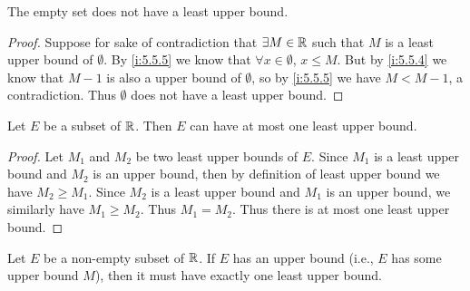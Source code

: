 \setcounter{thm}{6}
\begin{eg}\label{i:5.5.7}
  The empty set does not have a least upper bound.
\end{eg}

\begin{proof}
  Suppose for sake of contradiction that \(\exists M \in \mathbb{R}\) such that \(M\) is a least upper bound of \(\emptyset\).
  By \cref{i:5.5.5} we know that \(\forall x \in \emptyset\), \(x \leq M\).
  But by \cref{i:5.5.4} we know that \(M - 1\) is also a upper bound of \(\emptyset\), so by \cref{i:5.5.5} we have \(M < M - 1\), a contradiction.
  Thus \(\emptyset\) does not have a least upper bound.
\end{proof}

\begin{prop}\label{i:5.5.8}
  Let \(E\) be a subset of \(\mathbb{R}\).
  Then \(E\) can have at most one least upper bound.
\end{prop}

\begin{proof}
  Let \(M_1\) and \(M_2\) be two least upper bounds of \(E\).
  Since \(M_1\) is a least upper bound and \(M_2\) is an upper bound, then by definition of least upper bound we have \(M_2 \geq M_1\).
  Since \(M_2\) is a least upper bound and \(M_1\) is an upper bound, we similarly have \(M_1 \geq M_2\).
  Thus \(M_1 = M_2\).
  Thus there is at most one least upper bound.
\end{proof}

\begin{thm}\label{i:5.5.9}
  Let \(E\) be a non-empty subset of \(\mathbb{R}\).
  If \(E\) has an upper bound (i.e., \(E\) has some upper bound \(M\)), then it must have exactly one least upper bound.
\end{thm}

